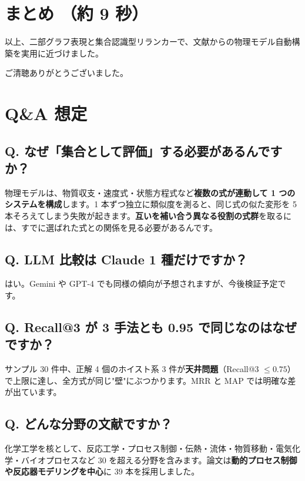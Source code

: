 \documentclass[a5paper,11pt]{ltjsarticle}
\begin{document}
\section*{まとめ \normalfont\small（約 9 秒）}

以上、二部グラフ表現と集合認識型リランカーで、文献からの物理モデル自動構築を実用に近づけました。

ご清聴ありがとうございました。

\newpage

\section*{Q\&A 想定}

\subsection*{Q. なぜ「集合として評価」する必要があるんですか？}
\small
物理モデルは、物質収支・速度式・状態方程式など\textbf{複数の式が連動して 1 つのシステムを構成}します。1 本ずつ独立に類似度を測ると、同じ式の似た変形を 5 本そろえてしまう失敗が起きます。\textbf{互いを補い合う異なる役割の式群}を取るには、すでに選ばれた式との関係を見る必要があるんです。
\normalsize

\subsection*{Q. LLM 比較は Claude 1 種だけですか？}
\small
はい。Gemini や GPT-4 でも同様の傾向が予想されますが、今後検証予定です。
\normalsize

\subsection*{Q. Recall@3 が 3 手法とも 0.95 で同じなのはなぜですか？}
\small
サンプル 30 件中、正解 4 個のホイスト系 3 件が\textbf{天井問題}（Recall@3 $\leq 0.75$）で上限に達し、全方式が同じ"壁"にぶつかります。MRR と MAP では明確な差が出ています。
\normalsize

\subsection*{Q. どんな分野の文献ですか？}
\small
化学工学を核として、反応工学・プロセス制御・伝熱・流体・物質移動・電気化学・バイオプロセスなど 30 を超える分野を含みます。論文は\textbf{動的プロセス制御や反応器モデリングを中心}に 39 本を採用しました。
\normalsize
\end{document}
